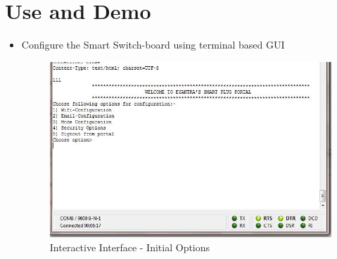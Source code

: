 \documentclass[a4paper,12pt,oneside]{book}
\begin{document}
\section{Use and Demo}
\begin{itemize}
	\item{Configure the Smart Switch-board using terminal based GUI }
	
	\begin{figure}[H]  \centering
		\includegraphics[width=13cm]{coolterm2.jpg}
		\caption{Interactive Interface - Initial Options}
		\label{34}
		

\end{figure}
\end{itemize}
\end{document}

